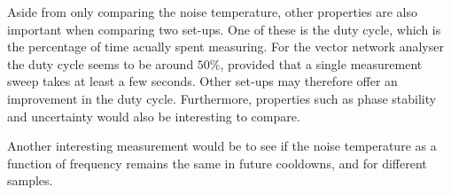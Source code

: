 \documentclass[12pt]{report}
\begin{document}
Aside from only comparing the noise temperature, other properties are also important when comparing two set-ups. One of these is the duty cycle, which is the percentage of time acually spent measuring. For the vector network analyser the duty cycle seems to be around $50\%$, provided that a single measurement sweep takes at least a few seconds. Other set-ups may therefore offer an improvement in the duty cycle. Furthermore, properties such as phase stability and uncertainty would also be interesting to compare.

Another interesting measurement would be to see if the noise temperature as a function of frequency remains the same in future cooldowns, and for different samples.




\end{document}
